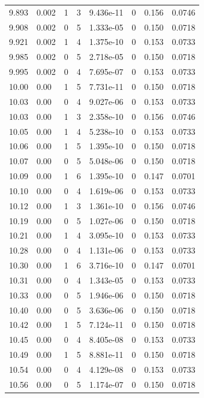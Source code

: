 \documentclass[preview]{standalone}
\begin{document}
{{{{{{{{{\begin{tabular}{L{1.2cm}C{1.2cm} C{0.3cm}C{0.5cm} C{1.4cm}C{1.4cm} C{1.4cm}C{1.4cm}}
  9.893  &  0.002  & 1     &  3 &  9.436e-11  & 0  & 0.156 &  0.0746   \\ 
  9.908  &  0.002  & 0     &  5 &  1.333e-05  & 0  & 0.150 &  0.0718   \\ 
  9.921  &  0.002  & 1     &  4 &  1.375e-10  & 0  & 0.153 &  0.0733   \\ 
  9.985  &  0.002  & 0     &  5 &  2.718e-05  & 0  & 0.150 &  0.0718   \\ 
  9.995  &  0.002  & 0     &  4 &  7.695e-07  & 0  & 0.153 &  0.0733   \\ 
  10.00  &  0.00  & 1     &  5 &  7.731e-11  & 0  & 0.150 &  0.0718   \\ 
  10.03  &  0.00  & 0     &  4 &  9.027e-06  & 0  & 0.153 &  0.0733   \\ 
  10.03  &  0.00  & 1     &  3 &  2.358e-10  & 0  & 0.156 &  0.0746   \\ 
  10.05  &  0.00  & 1     &  4 &  5.238e-10  & 0  & 0.153 &  0.0733   \\ 
  10.06  &  0.00  & 1     &  5 &  1.395e-10  & 0  & 0.150 &  0.0718   \\ 
  10.07  &  0.00  & 0     &  5 &  5.048e-06  & 0  & 0.150 &  0.0718   \\ 
  10.09  &  0.00  & 1     &  6 &  1.395e-10  & 0  & 0.147 &  0.0701   \\ 
  10.10  &  0.00  & 0     &  4 &  1.619e-06  & 0  & 0.153 &  0.0733   \\ 
  10.12  &  0.00  & 1     &  3 &  1.361e-10  & 0  & 0.156 &  0.0746   \\ 
  10.19  &  0.00  & 0     &  5 &  1.027e-06  & 0  & 0.150 &  0.0718   \\ 
  10.21  &  0.00  & 1     &  4 &  3.095e-10  & 0  & 0.153 &  0.0733   \\ 
  10.28  &  0.00  & 0     &  4 &  1.131e-06  & 0  & 0.153 &  0.0733   \\ 
  10.30  &  0.00  & 1     &  6 &  3.716e-10  & 0  & 0.147 &  0.0701   \\ 
  10.31  &  0.00  & 0     &  4 &  1.343e-05  & 0  & 0.153 &  0.0733   \\ 
  10.33  &  0.00  & 0     &  5 &  1.946e-06  & 0  & 0.150 &  0.0718   \\ 
  10.40  &  0.00  & 0     &  5 &  3.636e-06  & 0  & 0.150 &  0.0718   \\ 
  10.42  &  0.00  & 1     &  5 &  7.124e-11  & 0  & 0.150 &  0.0718   \\ 
  10.45  &  0.00  & 0     &  4 &  8.405e-08  & 0  & 0.153 &  0.0733   \\ 
  10.49  &  0.00  & 1     &  5 &  8.881e-11  & 0  & 0.150 &  0.0718   \\ 
  10.54  &  0.00  & 0     &  4 &  4.129e-08  & 0  & 0.153 &  0.0733   \\ 
  10.56  &  0.00  & 0     &  5 &  1.174e-07  & 0  & 0.150 &  0.0718   \\ 
\hline 
\end{tabular} 

}}}}}}}}}
\end{document}
